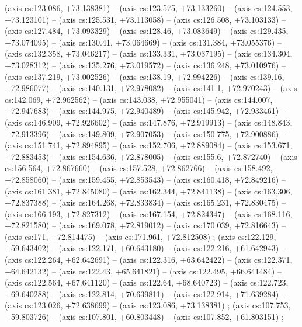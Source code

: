     (axis cs:123.086,    +73.138381) --  (axis cs:123.575,    +73.133260) --  (axis cs:124.553,    +73.123101) --  (axis cs:125.531,    +73.113058) --  (axis cs:126.508,    +73.103133) --  (axis cs:127.484,    +73.093329) --  (axis cs:128.46,    +73.083649) --  (axis cs:129.435,    +73.074095) --  (axis cs:130.41,    +73.064669) --  (axis cs:131.384,    +73.055376) --  (axis cs:132.358,    +73.046217) --  (axis cs:133.331,    +73.037195) --  (axis cs:134.304,    +73.028312) --  (axis cs:135.276,    +73.019572) --  (axis cs:136.248,    +73.010976) --  (axis cs:137.219,    +73.002526) --  (axis cs:138.19,    +72.994226) --  (axis cs:139.16,    +72.986077) --  (axis cs:140.131,    +72.978082) --  (axis cs:141.1,    +72.970243) --  (axis cs:142.069,    +72.962562) --  (axis cs:143.038,    +72.955041) --  (axis cs:144.007,    +72.947683) --  (axis cs:144.975,    +72.940489) --  (axis cs:145.942,    +72.933461) --  (axis cs:146.909,    +72.926602) --  (axis cs:147.876,    +72.919913) --  (axis cs:148.843,    +72.913396) --  (axis cs:149.809,    +72.907053) --  (axis cs:150.775,    +72.900886) --  (axis cs:151.741,    +72.894895) --  (axis cs:152.706,    +72.889084) --  (axis cs:153.671,    +72.883453) --  (axis cs:154.636,    +72.878005) --  (axis cs:155.6,    +72.872740) --  (axis cs:156.564,    +72.867660) --  (axis cs:157.528,    +72.862766) --  (axis cs:158.492,    +72.858060) --  (axis cs:159.455,    +72.853543) --  (axis cs:160.418,    +72.849216) --  (axis cs:161.381,    +72.845080) --  (axis cs:162.344,    +72.841138) --  (axis cs:163.306,    +72.837388) --  (axis cs:164.268,    +72.833834) --  (axis cs:165.231,    +72.830475) --  (axis cs:166.193,    +72.827312) --  (axis cs:167.154,    +72.824347) --  (axis cs:168.116,    +72.821580) --  (axis cs:169.078,    +72.819012) --  (axis cs:170.039,    +72.816643) --  (axis cs:171,    +72.814475) --  (axis cs:171.961,    +72.812508) ;
    (axis cs:122.129,    +59.643402) --  (axis cs:122.171,    +60.643180) --  (axis cs:122.216,    +61.642943) --  (axis cs:122.264,    +62.642691) --  (axis cs:122.316,    +63.642422) --  (axis cs:122.371,    +64.642132) --  (axis cs:122.43,    +65.641821) --  (axis cs:122.495,    +66.641484) --  (axis cs:122.564,    +67.641120) --  (axis cs:122.64,    +68.640723) --  (axis cs:122.723,    +69.640288) --  (axis cs:122.814,    +70.639811) --  (axis cs:122.914,    +71.639284) --  (axis cs:123.026,    +72.638699) --  (axis cs:123.086,    +73.138381) ;
    (axis cs:107.753,    +59.803726) --  (axis cs:107.801,    +60.803448) --  (axis cs:107.852,    +61.803151) ;
